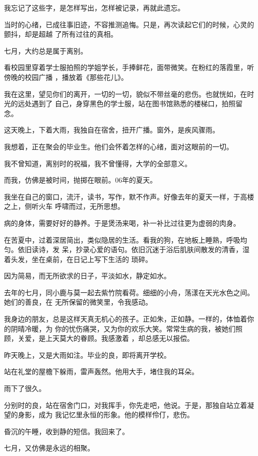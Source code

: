 \documentclass[12pt,a4paper]{article}
\begin{document}
		我忘记了这些字，是怎样写出，怎样被记录，再就此遗忘。

		当时的心绪，已成往事旧迹，不容推测追悔。只是，再次读起它们的时候，心灵的颤抖，却是超越
	了所有过往的真相。


		七月，大约总是属于离别。

		看校园里穿着学士服拍照的学姐学长，手捧鲜花，面带微笑。在粉红的落霞里，听傍晚的校园广播
	，播放着《那些花儿》。

		我在这里，望见你们的离开，一切的一切，貌似不带丝毫的悲伤。也就恍如，在时光的远处遇到了
	自己，身穿黑色的学士服，站在图书馆熟悉的楼梯口，拍照留念。

		这天晚上，下着大雨，我独自在宿舍，扭开广播。窗外，是疾风骤雨。

		我想着，正在聚会的毕业生。他们会怀着怎样的心绪，面对这眼前的一切。


		我不曾知道，离别时的祝福，我不曾懂得，大学的全部意义。


		而我，仿佛是被时间，抛掷在眼前。06年的夏天。


		我坐在自己的窗口，流汗，读书，写作，默不作声。好像去年的夏天一样，于高楼之上，侧听火车
	呼啸而过，无所思想。

		病的身体，需要好好的静养。于是煲汤来喝，补一补比过往更为虚弱的肉身。

		在苦夏中，过着深居简出，类似隐居的生活。看我的狗，在地板上睡熟，呼吸均匀。依旧读诗，发
	呆，抄录心爱的语句。依旧沉迷于浴后肌肤间散发的清香，湿着头发，坐在桌前，在日记上写下生活的
	琐碎。

		因为简易，而无所欲求的日子，平淡如水，静定如水。


		去年的七月，同小鹿与莫一起去紫竹院看荷。细细的小舟，荡漾在天光水色之间。她们的善良，在
	无所保留的微笑里，令我感动。

		我身边的朋友，总是这样天真无机心的孩子。正如朱，正如静。一样的，体恤着你的阴晴冷暖，为
	你的忧伤痛哭，又为你的欢乐大笑。常常生病的我，被她们照顾，关爱，是上天莫大的眷顾。我感激着
	，却总感无以报偿。


		昨天晚上，又是大雨如注。毕业的良，即将离开学校。

		站在礼堂的屋檐下躲雨，雷声轰然。他用大手，堵住我的耳朵。

		雨下了很久。

		分别时的良，站在宿舍门口，对我挥手，你先走吧，他说。于是，那独自站立着凝望的身影，成为
	我记忆里永恒的形象。他的模样伶仃，悲伤。


		昏沉的午睡，收到静的短信。我回来了。

		七月，又仿佛是永远的相聚。
\end{document}
